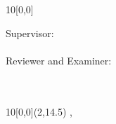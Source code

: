 \begin{titlepage}
\begin{textblock}{10}[0,0]
    
    {\large \textsf{Supervisor:}\\[2mm] }
    {\Large \textsf{\mysupervisor}}\\[10mm]
    
    {\large\textsf{Reviewer and Examiner:}\\[2mm] }
    {\Large \textsf{\reviewerOne}\\[5mm]
            \textsf{\reviewerTwo}}\\[10mm]

\end{textblock}


\begin{textblock}{10}[0,0](2,14.5)
    {\raggedleft \normalsize \textsf{\mysubmissiontown, \mysubmissionmonth~\mysubmissionyear}}
\end{textblock}




\null\newpage
\cleardoublepage

\end{titlepage}
